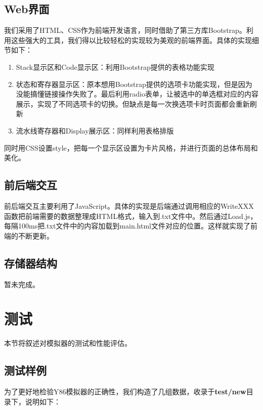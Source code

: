 \documentclass[12pt]{article} %
\begin{document}
\begin{sloppypar}
\subsection{Web界面}

我们采用了HTML、CSS作为前端开发语言，同时借助了第三方库Bootstrap。利用这些强大的工具，我们得以比较轻松的实现较为美观的前端界面。具体的实现细节如下：

\begin{enumerate}
\item Stack显示区和Code显示区：利用Bootstrap提供的表格功能实现
\item 状态和寄存器显示区：原本想用Bootstrap提供的选项卡功能实现，但是因为没能搞懂链接操作失败了。最后利用radio表单，让被选中的单选框对应的内容展示，实现了不同选项卡的切换。但缺点是每一次换选项卡时页面都会重新刷新
\item 流水线寄存器和Display展示区：同样利用表格排版
\end{enumerate}

同时用CSS设置style，把每一个显示区设置为卡片风格，并进行页面的总体布局和美化。

\subsection{前后端交互}

前后端交互主要利用了JavaScript。具体的实现是后端通过调用相应的WriteXXX函数把前端需要的数据整理成HTML格式，输入到.txt文件中。然后通过Load.js，每隔100ms把.txt文件中的内容加载到main.html文件对应的位置。这样就实现了前端的不断更新。

\subsection{存储器结构}

暂未完成。

\clearpage
\section{测试}

本节将叙述对模拟器的测试和性能评估。

\subsection{测试样例}

为了更好地检验Y86模拟器的正确性，我们构造了几组数据，收录于{\bf test/new}目录下，说明如下：


\end{sloppypar}
\end{document}
